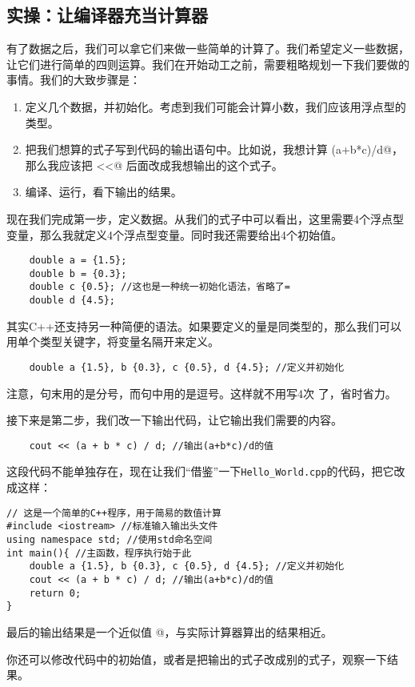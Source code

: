 \subsection*{实操：让编译器充当计算器}
有了数据之后，我们可以拿它们来做一些简单的计算了。我们希望定义一些数据，让它们进行简单的四则运算。我们在开始动工之前，需要粗略规划一下我们要做的事情。我们的大致步骤是：
\begin{enumerate}
    \item 定义几个数据，并初始化。考虑到我们可能会计算小数，我们应该用浮点型的 \lstinline@double@ 类型。
    \item 把我们想算的式子写到代码的输出语句中。比如说，我想计算 \lstinline@(a+b*c)/d@，那么我应该把 \lstinline@cout<<@ 后面改成我想输出的这个式子。    \item 编译、运行，看下输出的结果。
\end{enumerate}\par
现在我们完成第一步，定义数据。从我们的式子中可以看出，这里需要4个浮点型变量，那么我就定义4个浮点型变量。同时我还需要给出4个初始值。
\begin{lstlisting}
    double a = {1.5};
    double b = {0.3};
    double c {0.5}; //这也是一种统一初始化语法，省略了=
    double d {4.5};
\end{lstlisting}
其实C++还支持另一种简便的语法。如果要定义的量是同类型的，那么我们可以用单个类型关键字，将变量名隔开来定义。
\begin{lstlisting}
    double a {1.5}, b {0.3}, c {0.5}, d {4.5}; //定义并初始化
\end{lstlisting}
注意，句末用的是分号，而句中用的是逗号。这样就不用写4次 \lstinline@double@ 了，省时省力。\par
接下来是第二步，我们改一下输出代码，让它输出我们需要的内容。
\begin{lstlisting}
    cout << (a + b * c) / d; //输出(a+b*c)/d的值
\end{lstlisting}\par
这段代码不能单独存在，现在让我们``借鉴''一下\texttt{Hello\_World.cpp}的代码，把它改成这样：
\begin{lstlisting}[caption=\texttt{calc.cpp}\label{lst:calc1}]
// 这是一个简单的C++程序，用于简易的数值计算
#include <iostream> //标准输入输出头文件
using namespace std; //使用std命名空间
int main(){ //主函数，程序执行始于此
    double a {1.5}, b {0.3}, c {0.5}, d {4.5}; //定义并初始化
    cout << (a + b * c) / d; //输出(a+b*c)/d的值
    return 0;
}
\end{lstlisting}
最后的输出结果是一个近似值 @，与实际计算器算出的结果相近。\par
你还可以修改代码中的初始值，或者是把输出的式子改成别的式子，观察一下结果。\par
